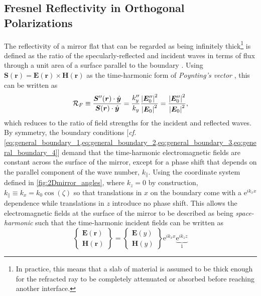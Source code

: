 \subsection{Fresnel Reflectivity in Orthogonal Polarizations}\label{sec:reflectivity_polarization}
The reflectivity of a mirror flat that can be regarded as being infinitely thick\footnote{In practice, this means that a slab of material is assumed to be thick enough for the refracted ray to be completely attenuated or absorbed before reaching another interface.} is defined as the ratio of the specularly-reflected and incident waves in terms of flux through a unit area of a surface parallel to the boundary \cite{Born80}. 
Using $\mathbold{S}(\mathbold{r}) = \mathbold{E}(\mathbold{r}) \times \mathbold{H}(\mathbold{r})$ as the time-harmonic form of \emph{Poynting's vector} \cite{Griffiths17,Jackson75}, this can be written as 
\begin{equation}\label{eq:fresnel_refl_def}
 \mathcal{R}_F \equiv \frac{\mathbold{S}''(\mathbold{r}) \cdot \mathbold{\hat{y}}}{\mathbold{S}(\mathbold{r}) \cdot \mathbold{\hat{y}}} = \frac{k_y''}{k_y} \frac{\abs{\mathbold{E}_0''}^2}{\abs{\mathbold{E}_0}^2} = \frac{\abs{\mathbold{E}_0''}^2}{\abs{\mathbold{E}_0}^2} ,
 \end{equation} 
which reduces to the ratio of field strengths for the incident and reflected waves. 
By symmetry, the boundary conditions [\emph{cf.\@} \cref{eq:general_boundary_1,eq:general_boundary_2,eq:general_boundary_3,eq:general_boundary_4}] demand that the time-harmonic electromagnetic fields are constant across the surface of the mirror, except for a phase shift that depends on the parallel component of the wave number, $k_{\parallel}$. 
Using the coordinate system defined in \cref{fig:2Dmirror_angles}, where $k_z = 0$ by construction, $k_{\parallel} \equiv k_x = k_0 \cos \left( \zeta \right)$ so that translations in $x$ on the boundary come with a $\mathrm{e}^{i k_x x}$ dependence while translations in $z$ introduce no phase shift. 
This allows the electromagnetic fields at the surface of the mirror to be described as being \emph{space-harmonic} such that the time-harmonic incident fields can be written as
\begin{equation}
 \left\{
 \begin{array}{lr}
 \mathbold{E} \left( \mathbold{r} \right) \\
 \mathbold{H} \left( \mathbold{r} \right)
 \end{array} 
 \right\} =  \left\{
 \begin{array}{lr}
 \mathbold{E} \left( y \right) \\
 \mathbold{H} \left( y \right)
 \end{array} 
 \right\} \mathrm{e}^{i k_x x} \underbrace{\mathrm{e}^{i k_z z}}_1 
 \end{equation} 

